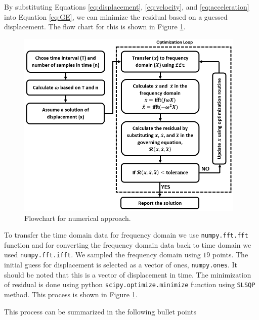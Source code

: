 \documentclass[12pt, a4paper]{extarticle}
\begin{document}
By substituting Equations \eqref{eq:displacement}, \eqref{eq:velocity}, and \eqref{eq:acceleration} into Equation \eqref{eq:GE}, we can minimize the residual based on a guessed displacement. The flow chart for this is shown in Figure \ref{fig:flowchart}.

\begin{figure}[h]
	\centering
	\includegraphics[height=9.00cm]{figure/minimize_residual.png}
	\caption{Flowchart for numerical approach.}
	\label{fig:flowchart}
\end{figure}

To transfer the time domain data for frequency domain we use \texttt{numpy.fft.fft} function and for converting the frequency domain data back to time domain we used \texttt{numpy.fft.ifft}. We sampled the frequency domain using $19$ points. The initial guess for displacement is selected as a vector of ones, \texttt{numpy.ones}. It should be noted that this is a vector of displacement in time. The minimization of residual is done using python \texttt{scipy.optimize.minimize} function using \texttt{SLSQP} method. This process is shown in Figure \ref{fig:flowchart}.

This process can be summarized in the following bullet points
\end{document}
